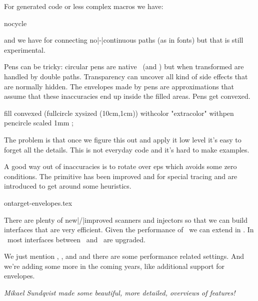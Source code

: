 For generated code or less complex macros we have:

\starttyping
nocycle
\stoptyping

and we have \type {&&} for connecting no|-|continuous paths (as in fonts)
but that is still experimental.

\stoptitle

\starttitle[title=Pens]

Pens can be tricky: circular pens are native \POSTSCRIPT\ (and \PDF) but when
transformed are handled by double paths. Transparency can uncover all kind of
side effects that are normally hidden. The envelopes made by pens are
approximations that assume that these inaccuracies end up inside the filled
areas. Pens get convexed.

\startbuffer
fill convexed (fullcircle xysized (10cm,1cm))
    withcolor "extracolor" withpen pencircle scaled 1mm ;
\stopbuffer

\typebuffer

\startlinecorrection
\processMPbuffer
\stoplinecorrection

The problem is that once we figure this out and apply it low level it's easy to
forget all the details. This is not everyday code and it's hard to make examples.

A good way out of inaccuracies is to rotate over eps which avoids some zero
conditions. The  primitive has been improved and for special
tracing  and  are introduced to get around some
heuristics.


\starttyping
ontarget-envelopes.tex
\stoptyping

\stoptitle

\starttitle[title=Lua]

There are plenty of new|/|improved scanners and injectors so that we can build
interfaces that are very efficient. Given the performance of \METAPOST\ we can
extend in \LUA. In \CONTEXT\ most interfaces between \TEX\ and \METAPOST\ are
upgraded.

\stoptitle

\starttitle[title=Etcetera]

We just mention , ,  and
 and there are some performance related settings. And we're
adding some more in the coming years, like additional support for envelopes.

{\em Mikael Sundqvist made some beautiful, more detailed, overviews of features!}

\stoptitle

\stoptext
